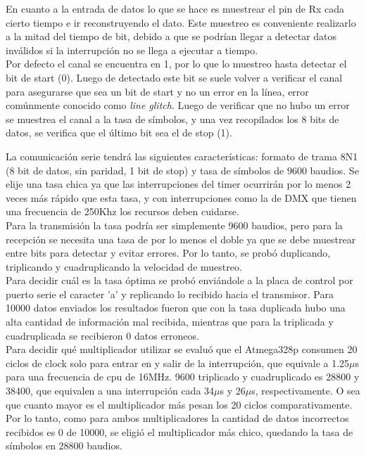 En cuanto a la entrada de datos lo que se hace es muestrear el pin de Rx cada cierto tiempo e ir reconstruyendo el dato. Este muestreo es conveniente realizarlo a la mitad del tiempo de bit, debido a que se podrían llegar a detectar datos inválidos si la interrupción no se llega a ejecutar a tiempo.\\
Por defecto el canal se encuentra en 1, por lo que lo muestreo hasta detectar el bit de start (0). Luego de detectado este bit se suele volver a verificar el canal para asegurarse que sea un bit de start y no un error en la línea, error comúnmente conocido como \textit{line glitch}. Luego de verificar que no hubo un error se muestrea el canal a la tasa de símbolos, y una vez recopilados los 8 bits de datos, se verifica que el último bit sea el de stop (1).

La comunicación serie tendrá las siguientes características: formato de trama 8N1 (8 bit de datos, sin paridad, 1 bit de stop) y tasa de símbolos de 9600 baudios. Se elije una tasa chica ya que las interrupciones del timer ocurrirán por lo menos 2 veces más rápido que esta tasa, y con interrupciones como la de DMX que tienen una frecuencia de 250Khz los recursos deben cuidarse.\\
Para la transmisión la tasa podría ser simplemente 9600 baudios, pero para la recepción se necesita una tasa de por lo menos el doble ya que se debe muestrear entre bits para detectar y evitar errores. Por lo tanto, se probó duplicando, triplicando y cuadruplicando la velocidad de muestreo. \\
Para decidir cuál es la tasa óptima se probó enviándole a la placa de control por puerto serie el caracter 'a' y replicando lo recibido hacia el transmisor. Para 10000 datos enviados los resultados fueron que con la tasa duplicada hubo una alta cantidad de información mal recibida, mientras que para la triplicada y cuadruplicada se recibieron 0 datos erroneos. \\
Para decidir qué multiplicador utilizar se evaluó que el Atmega328p consumen 20 ciclos de clock solo para entrar en y salir de la interrupción, que equivale a 1.25\(\mu\)s para una frecuencia de cpu de 16MHz. 9600 triplicado y cuadruplicado es 28800 y 38400, que equivalen a una interrupción cada 34\(\mu\)s y 26\(\mu\)s, respectivamente. O sea que cuanto mayor es el multiplicador más pesan los 20 ciclos comparativamente. Por lo tanto, como para ambos multiplicadores la cantidad de datos incorrectos recibidos es 0 de 10000, se eligió el multiplicador más chico, quedando la tasa de símbolos en 28800 baudios.

